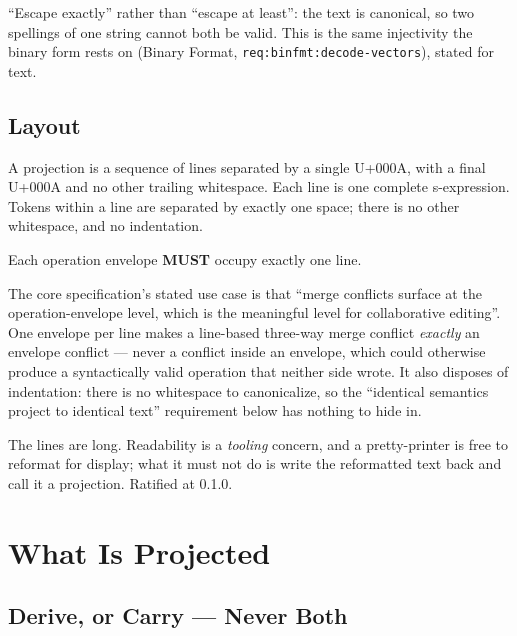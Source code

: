 \documentclass[11pt,letterpaper]{report}
\newcounter{requirement}[chapter]
\newcommand{\MUST}{\textbf{MUST}}
\begin{document}
\begin{rationale}
  ``Escape exactly'' rather than ``escape at least'': the text is canonical, so
  two spellings of one string cannot both be valid. This is the same injectivity
  the binary form rests on (Binary Format,
  \texttt{req:binfmt:decode-vectors}), stated for text.
\end{rationale}

\section{Layout}

\begin{requirement}
  \label{req:textproj:envelope-per-line}
  A projection is a sequence of lines separated by a single U+000A, with a final
  U+000A and no other trailing whitespace. Each line is one complete
  s-expression. Tokens within a line are separated by exactly one space; there is
  no other whitespace, and no indentation.

  Each operation envelope \MUST{} occupy exactly one line.
\end{requirement}

\begin{rationale}
  The core specification's stated use case is that ``merge conflicts surface at
  the operation-envelope level, which is the meaningful level for collaborative
  editing''. One envelope per line makes a line-based three-way merge conflict
  \emph{exactly} an envelope conflict --- never a conflict inside an envelope,
  which could otherwise produce a syntactically valid operation that neither side
  wrote. It also disposes of indentation: there is no whitespace to canonicalize,
  so the ``identical semantics project to identical text'' requirement below has
  nothing to hide in.

  The lines are long. Readability is a \emph{tooling} concern, and a
  pretty-printer is free to reformat for display; what it must not do is write
  the reformatted text back and call it a projection. Ratified at 0.1.0.
\end{rationale}

\chapter{What Is Projected}
\label{ch:content}

\section{Derive, or Carry --- Never Both}
\label{sec:content:derive-or-carry}
\end{document}
